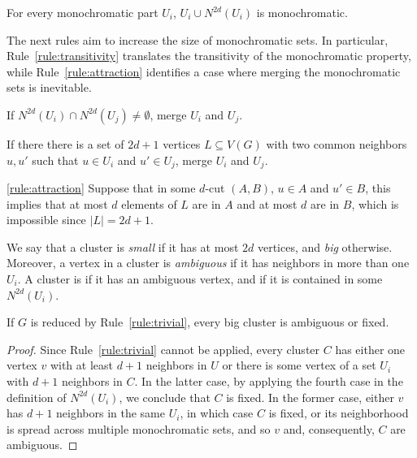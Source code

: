 \begin{observation}
    For every monochromatic part $U_i$, $U_i \cup N^{2d}(U_i)$ is monochromatic.
\end{observation}

The next rules aim to increase the size of monochromatic sets.
In particular, Rule~\ref{rule:transitivity} translates the transitivity of the monochromatic property, while Rule~\ref{rule:attraction} identifies a case where merging the monochromatic sets is inevitable.

\begin{rrule}
    \label{rule:transitivity}
    If $N^{2d}(U_i) \cap N^{2d}(U_j) \neq \emptyset$, merge $U_i$ and $U_j$.
\end{rrule}

\begin{rrule}
    \label{rule:attraction}
    If there there is a set of $2d+1$ vertices $L \subseteq V(G)$ with two common neighbors $u,u'$ such that $u \in U_i$ and $u' \in U_j$, merge $U_i$ and $U_j$.
\end{rrule}

\begin{sproof}{\ref{rule:attraction}}
    Suppose that in some $d$-cut $(A, B)$, $u \in A$ and $u' \in B$, this implies that at most $d$ elements of $L$ are in $A$ and at most $d$ are in $B$, which is impossible since $|L| = 2d+1$.
\end{sproof}

We say that a cluster is \textit{small} if it has at most $2d$ vertices, and \textit{big} otherwise.
Moreover, a vertex in a cluster is \textit{ambiguous} if it has neighbors in more than one $U_i$.
A cluster is  if it has an ambiguous vertex, and  if it is contained in some $N^{2d}(U_i)$.

\begin{observation}
    \label{obs:fix_amb}
    If $G$ is reduced by Rule~\ref{rule:trivial}, every big cluster is ambiguous or fixed.
\end{observation}

\begin{proof}
    Since Rule~\ref{rule:trivial} cannot be applied, every cluster $C$ has either one vertex $v$ with at least $d + 1$ neighbors in $U$ or there is some vertex of a set $U_i$ with $d + 1$ neighbors in $C$.
    In the latter case, by applying the fourth case in the definition of $N^{2d}(U_i)$, we conclude that $C$ is fixed.
    In the former case, either $v$ has $d+1$ neighbors in the same $U_i$, in which case $C$ is fixed, or its neighborhood is spread across multiple monochromatic sets, and so $v$ and, consequently, $C$ are ambiguous.
\end{proof}


